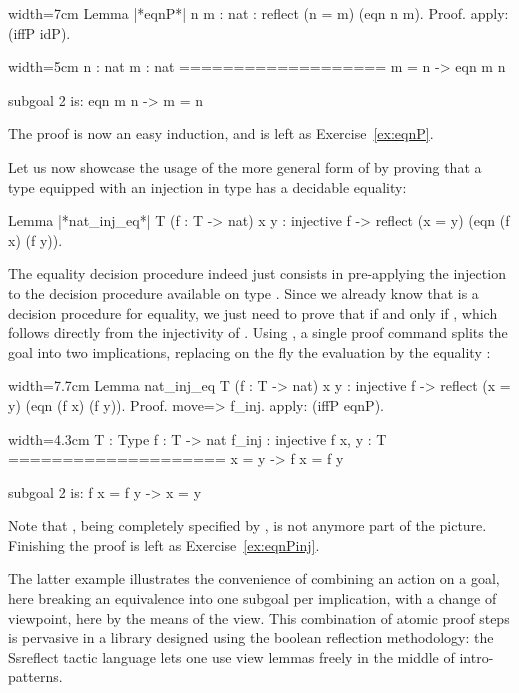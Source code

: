 \begin{coq}{}{width=7cm}
Lemma |*eqnP*| {n m : nat} :
  reflect (n = m) (eqn n m).
Proof.
apply: (iffP idP).
\end{coq}
\begin{coqout}{}{width=5cm}
n : nat
m : nat
===================
 m = n -> eqn m n

subgoal 2 is:
 eqn m n -> m = n
\end{coqout}
The proof is now an easy induction, and is left as Exercise~\ref{ex:eqnP}.

Let us now
showcase the usage of the more general form of  by proving
that a type equipped with an injection in type  has a
decidable equality:

\begin{coq}{}{}
Lemma |*nat_inj_eq*| T (f : T -> nat) x y :
  injective f -> reflect (x = y) (eqn (f x) (f y)).
\end{coq}
The equality decision procedure indeed just consists in pre-applying
the injection  to the decision procedure  available on
type . Since we already know that  is a decision
procedure for equality, we just need to prove that  if and
only if , which  follows directly from the injectivity of
. Using , a single proof command splits the goal into two
implications, replacing on the fly the evaluation
 by the  equality :

\begin{coq}{}{width=7.7cm}
Lemma nat_inj_eq T (f : T -> nat) x y :
  injective f ->
    reflect (x = y) (eqn (f x) (f y)).
Proof.
move=> f_inj.
apply: (iffP eqnP).
\end{coq}
\begin{coqout}{}{width=4.3cm}
T : Type
f : T -> nat
f_inj : injective f
x, y : T
====================
x = y -> f x = f y

subgoal 2 is:
 f x = f y -> x = y
\end{coqout}
Note that , being completely specified by , is not
anymore part of the picture.  Finishing the proof is left as
Exercise~\ref{ex:eqnPinj}.

The latter example illustrates the convenience of combining an action
on a goal, here breaking an equivalence into one subgoal per
implication, with a change of viewpoint, here by the means of the
 view. This combination of atomic proof steps is pervasive in
a library designed using the boolean reflection methodology: the
Ssreflect tactic language lets one use view lemmas freely
in the middle of intro-patterns.

